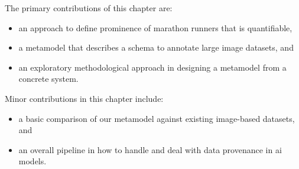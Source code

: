 \bigskip

\noindent
The primary contributions of this chapter are:

\begin{itemize}
  \item an approach to define prominence of marathon runners that is quantifiable,
  \item a metamodel that describes a schema to annotate large image datasets, and
  \item an exploratory methodological approach in designing a metamodel from a concrete system.
\end{itemize}

\noindent
Minor contributions in this chapter include:

\begin{itemize}
  \item a basic comparison of our metamodel against existing image-based datasets, and
  \item an overall pipeline in how to handle and deal with data provenance in \gls{ai} models.
\end{itemize}



